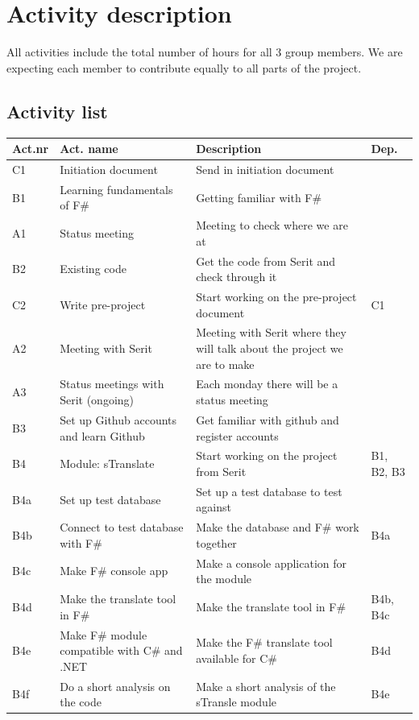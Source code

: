 \documentclass[12pt, a4paper]{article}
\begin{document}
\newpage
\section{Activity description}
All activities include the total number of hours for all 3 group members. We are expecting each member to contribute equally to all parts of the project.

\subsection{Activity list}

\begin{tabularx}{\textwidth}{|p{10mm}|X|X|p{10mm}|}
	\hline
	Act.nr&Act. name&Description&Dep.\\
	\hline
	C1&Initiation document&Send in initiation document&\\
	\hline
	B1&Learning fundamentals of F\#&Getting familiar with F\#&\\
	\hline
	A1&Status meeting&Meeting to check where we are at&\\
	\hline
	B2&Existing code&Get the code from Serit and check through it&\\
	\hline
	C2&Write pre-project&Start working on the pre-project document&C1\\
	\hline
	A2&Meeting with Serit&Meeting with Serit where they will talk about the project we are to make&\\
	\hline
	A3&Status meetings with Serit (ongoing)&Each monday there will be a status meeting&\\
	\hline
	B3&Set up Github accounts and learn Github&Get familiar with github and register accounts&\\
	\hline
	B4&Module: sTranslate&Start working on the project from Serit&B1, B2, B3\\
	\hline
	B4a&Set up test database&Set up a test database to test against&\\
	\hline
	B4b&Connect to test database with F\#&Make the database and F\# work together&B4a\\
	\hline
	B4c&Make F\# console app&Make a console application for the module&\\
	\hline
	B4d&Make the translate tool in F\#&Make the translate tool in F\#&B4b, B4c\\
	\hline
	B4e&Make F\# module compatible with C\# and .NET&Make the F\# translate tool available for C\#&B4d\\
	\hline
	B4f&Do a short analysis on the code&Make a short analysis of the sTransle module&B4e\\
	\hline
\end{tabularx}
	
\end{document}
